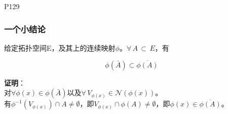 \documentclass[
]{article}
\begin{document}
P129

\hypertarget{ux4e00ux4e2aux5c0fux7ed3ux8bba}{%
\subsubsection{\texorpdfstring{\textbf{一个小结论}}{一个小结论}}\label{ux4e00ux4e2aux5c0fux7ed3ux8bba}}

给定拓扑空间E，及其上的连续映射\(\phi\)。\(\forall \, A\, \subset \, E\)，有

\[\phi(\bar{A})\subset\overline{\phi(A)}\]

\textbf{证明}：\\
对\(\forall \phi(x)\in \phi(\bar{A})\)以及\(\forall \, V_{\phi(x)}\in \mathcal N(\phi(x))\)。\\
有\(\phi^{-1}(V_{\phi(x)}) \cap A\neq \emptyset\)，即\(V_{\phi(x)} \cap \phi (A) \neq \emptyset\)，即\(\phi(x)\in \overline{\phi(A)}\)。
\end{document}
